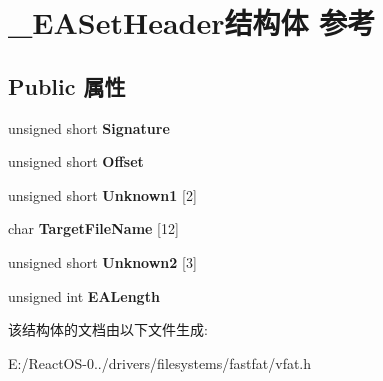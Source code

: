 \hypertarget{struct___e_a_set_header}{}\section{\+\_\+\+E\+A\+Set\+Header结构体 参考}
\label{struct___e_a_set_header}
\subsection*{Public 属性}
\begin{DoxyCompactItemize}
\item 
\mbox{\label{struct___e_a_set_header_a976b9b751a0733ec9fd9ebcec605b365}} 
unsigned short {\bfseries Signature}
\item 
\mbox{\label{struct___e_a_set_header_af3cd5f7a5c2b16cee71a6279b4c02225}} 
unsigned short {\bfseries Offset}
\item 
\mbox{\label{struct___e_a_set_header_a5e6e52f3e29440bb9ccb1ce39e5000b2}} 
unsigned short {\bfseries Unknown1} \mbox{[}2\mbox{]}
\item 
\mbox{\label{struct___e_a_set_header_ac7296b0a3adfd28dadef1eb18f6dda89}} 
char {\bfseries Target\+File\+Name} \mbox{[}12\mbox{]}
\item 
\mbox{\label{struct___e_a_set_header_aff5254dc3cbd5fb768c66d08a8ecdbbd}} 
unsigned short {\bfseries Unknown2} \mbox{[}3\mbox{]}
\item 
\mbox{\label{struct___e_a_set_header_a8043e1639f393eb24e2c73ed25f712be}} 
unsigned int {\bfseries E\+A\+Length}
\end{DoxyCompactItemize}


该结构体的文档由以下文件生成\+:\begin{DoxyCompactItemize}
\item 
E\+:/\+React\+O\+S-\/0../drivers/filesystems/fastfat/vfat.\+h\end{DoxyCompactItemize}
